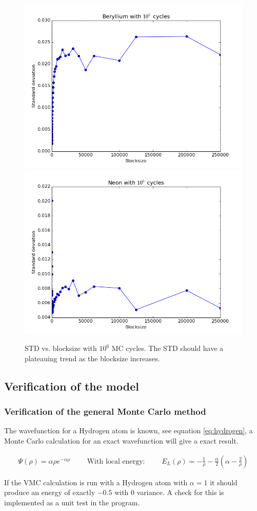\documentclass[11pt]{article}
\begin{document}
		\begin{figure}
			\centering \includegraphics[width=0.45\linewidth]{../figures/Beryllium_blocking}
			\centering \includegraphics[width=0.45\linewidth]{../figures/Neon_blocking}
			\protect\caption{STD vs. blocksize with $10^{6}$ MC cycles.  The STD should have a plateauing trend as the blocksize increases.} \label{fig01:std_Stuff}
		\end{figure}

	\subsection{Verification of the model}
		\subsubsection{Verification of the general Monte Carlo method}
			The wavefunction for a Hydrogen atom is known, see equation \eqref{eq:hydrogen}, a Monte Carlo calculation for an exact wavefunction will give a exact result.

			\begin{align}
				 \Psi(\rho ) = \alpha \rho e^{-\alpha\rho} \qquad \text{ With  local energy: } \qquad E_{L} (\rho) = - \frac{1}{\rho} - \frac{\alpha}{2} \left( \alpha - \frac{2}{\rho} \right) \label{eq:hydrogen}
			\end{align}

			If the VMC calculation is run with a Hydrogen atom with \(\alpha = 1\) it should produce an energy of exactly \( -0.5\) with \(0\) variance. A check for this is implemented as a unit test in the program.
\end{document}
